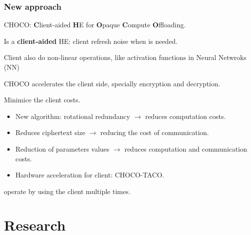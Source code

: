 \documentclass[10pt,handout]{beamer}
\begin{document}
\begin{frame}
\frametitle{New approach}

CHOCO: \textbf{C}lient-aided \textbf{H}E for \textbf{O}paque \textbf{C}ompute \textbf{O}ffloading.

    Is a \textbf{client-aided} HE: client refresh noise when is needed.

    Client also do non-linear operations, like activation functions in Neural Netwroks (NN)

     CHOCO accelerates the client side, specially encryption and decryption.

    Minimice the client costs.
\begin{itemize}\itemsep-0.7em
        \item New algorithm: rotational redundancy $\rightarrow$ reduces computation costs.
    \item Reduces ciphertext size $\rightarrow$ reducing the cost of communication.
    \item Reduction of parameters values $\rightarrow$ reduces computation and communication costs.
    \item Hardware acceleration for client: CHOCO-TACO.
\end{itemize}
\end{frame}

operate by using the client multiple times.


\section{Research}
\end{document}
